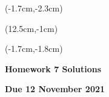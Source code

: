 \documentclass[12pt, oneside]{article}
\begin{document}
\begin{textblock*}{4cm}(-1.7cm,-2.3cm)
\end{textblock*}

\begin{textblock*}{8cm}(12.5cm,-1cm)
\end{textblock*}
\begin{textblock*}{13.5cm}(-1.7cm,-1.8cm)
\end{textblock*}

\vspace{1cm}

\begin{center}
\textbf{\Large Homework 7 Solutions}

\textbf{Due 12 November 2021}
\end{center}
\end{document}
